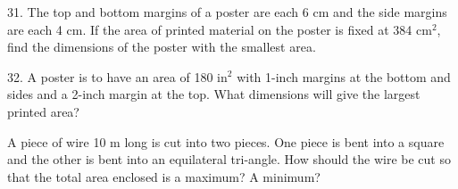 \documentclass{sebase}
\begin{document}
\begin{multicols}{2}
\begin{ExerciseList}
\item[\hfill 31.] The top and bottom margins of a poster are each 6 cm and
the side margins are each 4 cm. If the area of printed material on the
poster is fixed at 384 $\mathrm{cm}^{2}$, find the dimensions of the poster
with the smallest area.

%

%

\item[\hfill 32.] A poster is to have an area of 180 $\mathrm{in}^{2}$ with
1-inch margins at the bottom and sides and a 2-inch margin at the top. What
dimensions will give the largest printed area?

%

\item[{\hfill {\protect\fbox{\hspace{-2pt}33.\hspace{-2pt}}}}] A piece of
wire 10 m long is cut into two pieces. One piece is bent into a square and
the other is bent into an equilateral tri-\linebreak angle. How should the
wire be cut so that the total area enclosed is  a
maximum?  A minimum?

%

%
%
%
%
%
%
%
%


\end{ExerciseList}
\end{multicols}
\end{document}
